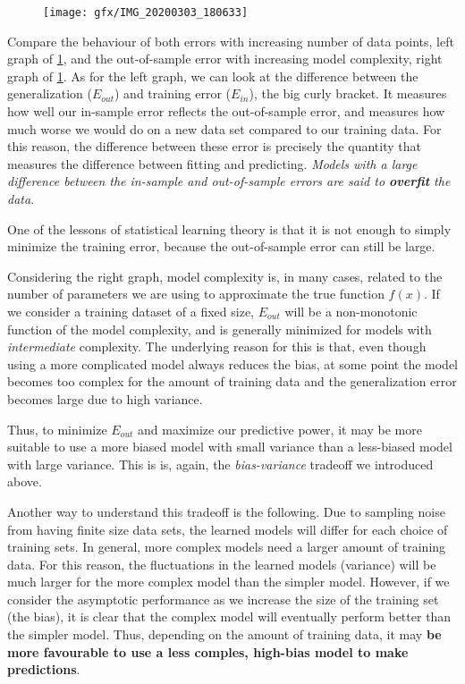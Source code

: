 \begin{figure}[h!]
	\centering
	\texttt{[image: gfx/IMG\_20200303\_180633]}
	\caption{}
	\label{fig:errorbehaviour}
\end{figure}
Compare the behaviour of both errors with increasing number of data points, left graph of \ref{fig:errorbehaviour}, and the out-of-sample error with increasing model complexity, right graph of \ref{fig:errorbehaviour}. As for the left graph, we can look at the difference between the generalization ($E_{out}$) and training error ($E_{in}$), the big curly bracket. It measures how well our in-sample error reflects the out-of-sample error, and measures how much worse we would do on a new data set compared to our training data. For this reason, the difference between these error is precisely the quantity that measures the difference between fitting and predicting. \emph{Models with a large difference between the in-sample and out-of-sample errors are said to \textbf{overfit} the data}. 
\begin{mybox}{}
	One of the lessons of statistical learning theory is that it is not enough to simply minimize the training error, because the out-of-sample error can still be large.
\end{mybox}
Considering the right graph, model  complexity is, in many cases, related to the number of parameters we are using to approximate the true function $f(x)$. If we consider a training dataset of a fixed size, $E_{out}$ will be a non-monotonic function of the model complexity, and is generally minimized for models with \emph{intermediate} complexity. The underlying reason for this is that, even though using a more complicated model always reduces the bias, at some point the model becomes too complex for the amount of training data and the generalization error becomes large due to high variance.
\begin{mybox}{}
Thus, to minimize $E_{out}$ and maximize our predictive power, it may be more suitable to use a more biased model with small variance than a less-biased model with large variance. This is is, again, the \emph{bias-variance} tradeoff we introduced above.
\end{mybox} 
Another way to understand this tradeoff is the following. Due to sampling noise from having finite size data sets, the learned models will differ for each choice of training sets. In general, more complex models need a larger amount of training data. For this reason, the fluctuations in the learned models (variance) will be much larger for the more complex model than the simpler model. However, if we consider the asymptotic performance as we increase the size of the training set (the bias), it is clear that the complex model will eventually perform better than the simpler model. Thus, depending on the amount of training data, it may \textbf{be more favourable to use a less comples, high-bias model to make predictions}.








